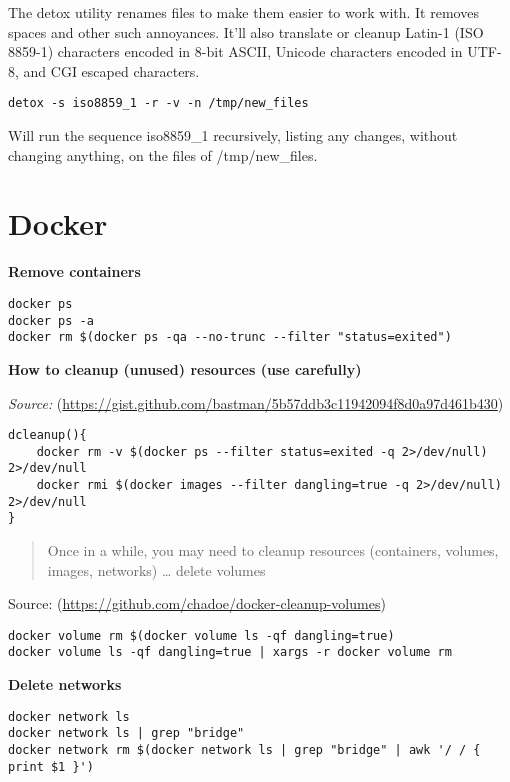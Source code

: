 \documentclass[]{book}
\theoremstyle{definition}
\theoremstyle{definition}
\theoremstyle{definition}
\theoremstyle{remark}
\begin{document}
The detox utility renames files to make them easier to work with. It
removes spaces and other such annoyances. It'll also translate or
cleanup Latin-1 (ISO 8859-1) characters encoded in 8-bit ASCII, Unicode
characters encoded in UTF-8, and CGI escaped characters.

\begin{verbatim}
detox -s iso8859_1 -r -v -n /tmp/new_files
\end{verbatim}

Will run the sequence iso8859\_1 recursively, listing any changes,
without changing anything, on the files of /tmp/new\_files.

\chapter{Docker}\label{docker}

\textbf{Remove containers}

\begin{verbatim}
docker ps
docker ps -a
docker rm $(docker ps -qa --no-trunc --filter "status=exited")
\end{verbatim}

\textbf{How to cleanup (unused) resources (use carefully)}

\emph{Source:}
(\url{https://gist.github.com/bastman/5b57ddb3c11942094f8d0a97d461b430})

\begin{verbatim}
dcleanup(){
    docker rm -v $(docker ps --filter status=exited -q 2>/dev/null) 2>/dev/null
    docker rmi $(docker images --filter dangling=true -q 2>/dev/null) 2>/dev/null
}
\end{verbatim}

\begin{quote}
Once in a while, you may need to cleanup resources (containers, volumes,
images, networks) \ldots{} delete volumes
\end{quote}

Source: (\url{https://github.com/chadoe/docker-cleanup-volumes})

\begin{verbatim}
docker volume rm $(docker volume ls -qf dangling=true)
docker volume ls -qf dangling=true | xargs -r docker volume rm
\end{verbatim}

\textbf{Delete networks}

\begin{verbatim}
docker network ls  
docker network ls | grep "bridge"   
docker network rm $(docker network ls | grep "bridge" | awk '/ / { print $1 }')
\end{verbatim}
\end{document}

